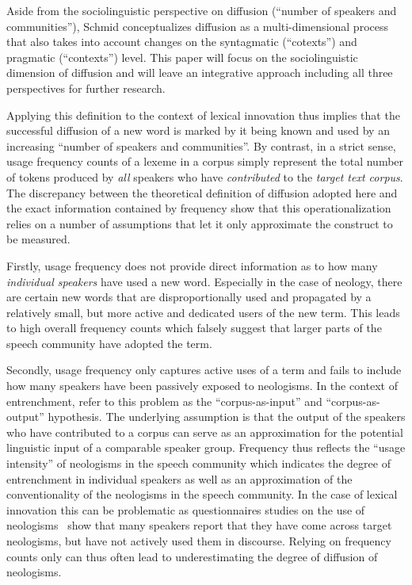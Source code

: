\documentclass[a4paper]{scrartcl}
\begin{document}
    Aside from the sociolinguistic perspective on diffusion (\enquote{number of speakers and communities}), Schmid conceptualizes diffusion as a multi-dimensional process that also takes into account changes on the syntagmatic (\enquote{cotexts}) and pragmatic (\enquote{contexts}) level. This paper will focus on the sociolinguistic dimension of diffusion and will leave an integrative approach including all three perspectives for further research.

    Applying this definition to the context of lexical innovation thus implies that the successful diffusion of a new word is marked by it being known and used by an increasing \enquote{number of speakers and communities}. By contrast, in a strict sense, usage frequency counts of a lexeme in a corpus simply represent the total number of tokens produced by \emph{all} speakers who have \emph{contributed} to the \emph{target text corpus}. The discrepancy between the theoretical definition of diffusion adopted here and the exact information contained by frequency show that this operationalization relies on a number of assumptions that let it only approximate the construct to be measured.

    Firstly, usage frequency does not provide direct information as to how many \emph{individual speakers} have used a new word. Especially in the case of neology, there are certain new words that are disproportionally used and propagated by a relatively small, but more active and dedicated users of the new term. This leads to high overall frequency counts which falsely suggest that larger parts of the speech community have adopted the term.

    Secondly, usage frequency only captures active uses of a term and fails to include how many speakers have been passively exposed to neologisms. In the context of entrenchment, \textcite{Stefanowitsch2017} refer to this problem as the \enquote{corpus-as-input} and \enquote{corpus-as-output} hypothesis. The underlying assumption is that the output of the speakers who have contributed to a corpus can serve as an approximation for the potential linguistic input of a comparable speaker group. Frequency thus reflects the \enquote{usage intensity} of neologisms in the speech community which indicates the degree of entrenchment in individual speakers as well as an approximation of the conventionality of the neologisms in the speech community. In the case of lexical innovation this can be problematic as questionnaires studies on the use of neologisms~\parencite{Kerremans2015} show that many speakers report that they have come across target neologisms, but have not actively used them in discourse. Relying on frequency counts only can thus often lead to underestimating the degree of diffusion of neologisms.
\end{document}

